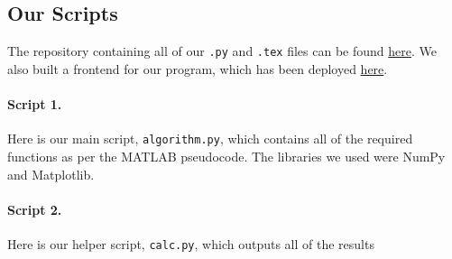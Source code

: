 \documentclass{scrartcl}
\begin{document}
\subsection{Our Scripts}
\begin{foreword}
    The repository containing all of our \texttt{.py} and \texttt{.tex} files can be found \href{https://github.com/Car-XY/CIV-GOATS-Bridge-Sim}{here}. We also built a frontend for our program, which has been deployed \href{https://car-xy.github.io/CIV-GOATS-Bridge-Sim/}{here}.
\end{foreword}
\paragraph{Script 1.} Here is our main script, \texttt{algorithm.py}, which contains all of the required functions as per the MATLAB pseudocode. The libraries we used were NumPy and Matplotlib.


\paragraph{Script 2.} Here is our helper script, \texttt{calc.py}, which outputs all of the results
 
\end{document}
